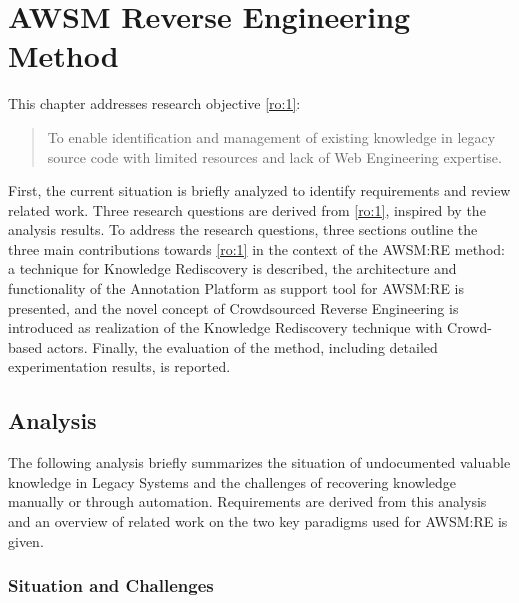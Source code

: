 \hypertarget{sec:awsm-re}{%
\chapter{AWSM Reverse Engineering Method}\label{sec:awsm-re}}

This chapter addresses research objective \cref{ro:1}:

\begin{quote}
To enable identification and management of existing knowledge in legacy source code with limited resources and lack of \gls{Web Engineering} expertise.
\end{quote}

\vspace{-5pt}
First, the current situation is briefly analyzed to identify requirements and review related work.
Three research questions are derived from \cref{ro:1}, inspired by the analysis results. 
To address the research questions, three sections outline the three main contributions towards \cref{ro:1} in the context of the AWSM:RE method: a technique for Knowledge Rediscovery is described, the architecture and functionality of the Annotation Platform as support tool for AWSM:RE is presented, and the novel concept of Crowdsourced \gls{Reverse Engineering} is introduced as realization of the Knowledge Rediscovery technique with Crowd-based actors.
Finally, the evaluation of the method, including detailed experimentation results, is reported.

\vspace{-28pt}
\hypertarget{analysis}{%
\section{Analysis}\label{analysis}}
\vspace{4pt}

The following analysis briefly summarizes the situation of undocumented valuable knowledge in \glspl{Legacy System} and the challenges of recovering knowledge manually or through automation.
Requirements are derived from this analysis and an overview of related work on the two key paradigms used for AWSM:RE is given.

\subsection{Situation and Challenges}
\vspace{5pt}

